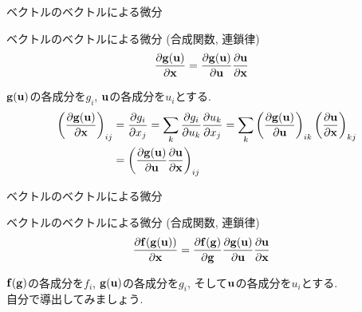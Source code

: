 \documentclass[dvipdfmx,notheorems,t]{beamer}
\begin{document}
\begin{frame}{ベクトルのベクトルによる微分}
\begin{block}{ベクトルのベクトルによる微分 (合成関数, 連鎖律)}
  \begin{align*}
    \pdv{\vb{g}(\vb{u})}{\vb{x}} &= \pdv{\vb{g}(\vb{u})}{\vb{u}} \pdv{\vb{u}}{\vb{x}}
  \end{align*}
\end{block}

$\vb{g}(\vb{u})$の各成分を$g_i$, $\vb{u}$の各成分を$u_i$とする.
\begin{align*}
  \left( \pdv{\vb{g}(\vb{u})}{\vb{x}} \right)_{ij} &= \pdv{g_i}{x_j}
    = \sum_k \pdv{g_i}{u_k} \pdv{u_k}{x_j}
    = \sum_k \left( \pdv{\vb{g}(\vb{u})}{\vb{u}} \right)_{ik} \left( \pdv{\vb{u}}{\vb{x}} \right)_{kj} \\
    &= \left( \pdv{\vb{g}(\vb{u})}{\vb{u}} \pdv{\vb{u}}{\vb{x}} \right)_{ij}
\end{align*}
\end{frame}

\begin{frame}{ベクトルのベクトルによる微分}
\begin{block}{ベクトルのベクトルによる微分 (合成関数, 連鎖律)}
  \begin{align*}
    \pdv{\vb{f}(\vb{g}(\vb{u}))}{\vb{x}}
      &= \pdv{\vb{f}(\vb{g})}{\vb{g}} \pdv{\vb{g}(\vb{u})}{\vb{u}} \pdv{\vb{u}}{\vb{x}}
  \end{align*}
\end{block}

$\vb{f}(\vb{g})$の各成分を$f_i$, $\vb{g}(\vb{u})$の各成分を$g_i$, そして$\vb{u}$の各成分を$u_i$とする. \\
自分で導出してみましょう.
\end{frame}
\end{document}
